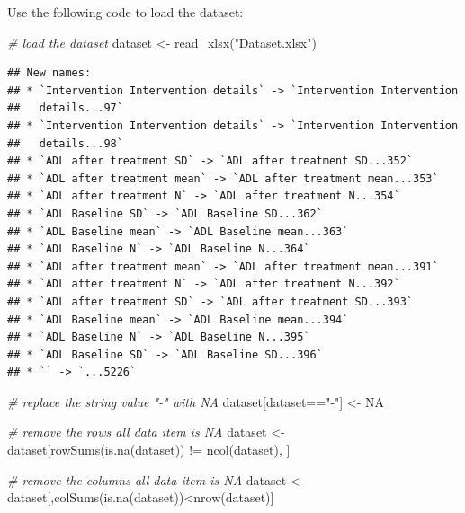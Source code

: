 \documentclass[
]{article}
\newenvironment{Shaded}{\begin{snugshade}}{\end{snugshade}}
\newcommand{\CommentTok}[1]{\textcolor[rgb]{0.56,0.35,0.01}{\textit{#1}}}
\newcommand{\ConstantTok}[1]{\textcolor[rgb]{0.00,0.00,0.00}{#1}}
\newcommand{\FunctionTok}[1]{\textcolor[rgb]{0.00,0.00,0.00}{#1}}
\newcommand{\NormalTok}[1]{#1}
\newcommand{\OtherTok}[1]{\textcolor[rgb]{0.56,0.35,0.01}{#1}}
\newcommand{\SpecialCharTok}[1]{\textcolor[rgb]{0.00,0.00,0.00}{#1}}
\newcommand{\StringTok}[1]{\textcolor[rgb]{0.31,0.60,0.02}{#1}}
\begin{document}
Use the following code to load the dataset:

\begin{Shaded}
\begin{Highlighting}[]
\CommentTok{\# load the dataset}
\NormalTok{dataset }\OtherTok{\textless{}{-}} \FunctionTok{read\_xlsx}\NormalTok{(}\StringTok{"Dataset.xlsx"}\NormalTok{)}
\end{Highlighting}
\end{Shaded}

\begin{verbatim}
## New names:
## * `Intervention Intervention details` -> `Intervention Intervention
##   details...97`
## * `Intervention Intervention details` -> `Intervention Intervention
##   details...98`
## * `ADL after treatment SD` -> `ADL after treatment SD...352`
## * `ADL after treatment mean` -> `ADL after treatment mean...353`
## * `ADL after treatment N` -> `ADL after treatment N...354`
## * `ADL Baseline SD` -> `ADL Baseline SD...362`
## * `ADL Baseline mean` -> `ADL Baseline mean...363`
## * `ADL Baseline N` -> `ADL Baseline N...364`
## * `ADL after treatment mean` -> `ADL after treatment mean...391`
## * `ADL after treatment N` -> `ADL after treatment N...392`
## * `ADL after treatment SD` -> `ADL after treatment SD...393`
## * `ADL Baseline mean` -> `ADL Baseline mean...394`
## * `ADL Baseline N` -> `ADL Baseline N...395`
## * `ADL Baseline SD` -> `ADL Baseline SD...396`
## * `` -> `...5226`
\end{verbatim}

\begin{Shaded}
\begin{Highlighting}[]
\CommentTok{\# replace the string value "{-}" with NA}
\NormalTok{dataset[dataset}\SpecialCharTok{==}\StringTok{"{-}"}\NormalTok{]  }\OtherTok{\textless{}{-}} \ConstantTok{NA}

\CommentTok{\# remove the rows all data item is NA}
\NormalTok{dataset }\OtherTok{\textless{}{-}}\NormalTok{ dataset[}\FunctionTok{rowSums}\NormalTok{(}\FunctionTok{is.na}\NormalTok{(dataset)) }\SpecialCharTok{!=} \FunctionTok{ncol}\NormalTok{(dataset), ]}

\CommentTok{\# remove the columns all data item is NA}
\NormalTok{dataset }\OtherTok{\textless{}{-}}\NormalTok{ dataset[,}\FunctionTok{colSums}\NormalTok{(}\FunctionTok{is.na}\NormalTok{(dataset))}\SpecialCharTok{\textless{}}\FunctionTok{nrow}\NormalTok{(dataset)]}
\end{Highlighting}
\end{Shaded}
\end{document}
